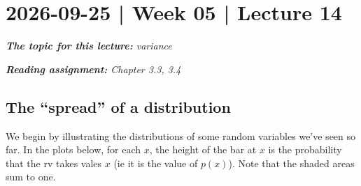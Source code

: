 \documentclass[10pt]{article}
\theoremstyle{definition}
\newcommand{\1}[1]{\textbf{1}_{\left[#1\right]}} %
\def\E{\mathbb{E}} %
\begin{document}

\newpage
\section{2026-09-25 | Week 05 | Lecture 14}
\begin{center}
  \begin{tcolorbox}[width=0.9\textwidth, colback=white, colframe=black]
    \textit{\textbf{The topic for this lecture:} variance}

    \textit{\textbf{Reading assignment:} Chapter 3.3, 3.4}
  \end{tcolorbox}
\end{center}

\subsection{The ``spread'' of a distribution}
We begin by illustrating the distributions of some random variables we've seen
so far. In the plots below, for each $x$, the height of the bar at $x$ is the
probability that the rv takes vales $x$ (ie it is the value of $p(x)$). Note
that the shaded areas sum to one.
\end{document}
